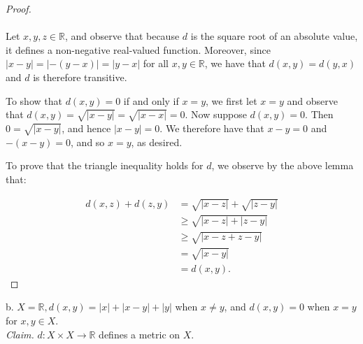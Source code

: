     \begin{proof}\ \\\\
        Let $x, y, z \in \mathbb{R}$, and observe that because $d$ is the square root of an absolute value, it defines a
        non-negative real-valued function. Moreover, since $|x - y| =  |-(y - x)| = |y - x|$ for all 
        $x, y \in \mathbb{R}$, we have that $d(x, y) = d(y, x)$ and $d$ is therefore transitive.

        To show that $d(x, y) = 0$ if and only if $x = y$, we first let $x = y$ and observe that 
        $d(x, y) = \sqrt{|x - y|} = \sqrt{|x - x|} = 0$. Now suppose $d(x, y) = 0$. Then $0 = \sqrt{|x - y|}$, and hence
        $|x - y| = 0$. We therefore have that $x - y = 0$ and $-(x - y) = 0$, and so
        $x = y$, as desired. 

        To prove that the triangle inequality holds for $d$, we observe by the above lemma that:
        
        \begin{align*}
            d(x, z) + d(z, y) &= \sqrt{|x - z|} + \sqrt{|z - y|} \\
                              &\ge \sqrt{|x - z| + |z - y|} \\
                              &\ge \sqrt{|x - z + z - y|} \\
                              &= \sqrt{|x - y|} \\
                              &= d(x, y).
        \end{align*}
    \end{proof}

    \pagebreak

b.  $X = \mathbb{R}, d(x, y) = |x| + |x - y| + |y|$ when $x \neq y$, and 
    $d(x, y) = 0$ when $x = y$ for $x, y \in X$. \ \\

    \emph{Claim.} $d: X \times X \to \mathbb{R}$ defines a metric on $X$.
    \ \\

